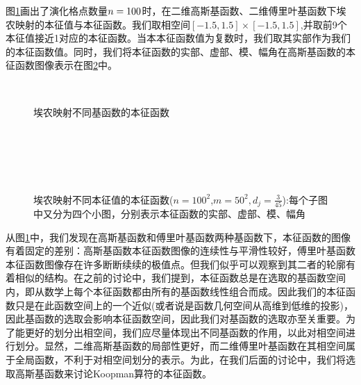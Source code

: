 图\ref{fig:henon_eig_RGFL}画出了演化格点数量$n=100\time 100$时，在二维高斯基函数、二维傅里叶基函数下埃农映射的本征值与本征函数。我们取相空间$[-1.5,1.5]\times [-1.5,1.5]$,并取前9个本征值接近1对应的本征函数。当本本征函数值为复数时，我们取其实部作为我们的本征函数值。同时，我们将本征函数的实部、虚部、模、幅角在高斯基函数的本征函数图像表示在图\ref{fig:Henon_eigen_Gauss_n100m50md45_figure8}中。
\begin{figure}
    \centering
    \\
    \caption[埃农映射不同基函数的本征函数]{埃农映射不同基函数的本征函数}\label{fig:henon_eig_RGFL}
\end{figure}
\begin{figure}
  \centering
  \\
  \\
  \\
  \\
  \caption[埃农映射不同本征值的本征函数]{埃农映射不同本征值的本征函数($n=100^2$,$m=50^2,d_j=\frac{3}{45}$):每个子图中又分为四个小图，分别表示本征函数的实部、虚部、模、幅角}\label{fig:Henon_eigen_Gauss_n100m50md45_figure8}
\end{figure}

从图\ref{fig:henon_eig_RGFL}中，我们发现在高斯基函数和傅里叶基函数两种基函数下，本征函数的图像有着固定的差别：高斯基函数本征函数图像的连续性与平滑性较好，傅里叶基函数本征函数图像存在许多断断续续的极值点。但我们似乎可以观察到其二者的轮廓有着相似的结构。在之前的讨论中，我们提到，本征函数总是在选取的基函数空间内，即从数学上每个本征函数都由所有的基函数线性组合而成。因此我们的本征函数只是在此函数空间上的一个近似(或者说是函数几何空间从高维到低维的投影)，因此基函数的选取会影响本征函数空间，因此我们对基函数的选取亦至关重要。为了能更好的划分出相空间，我们应尽量体现出不同基函数的作用，以此对相空间进行划分。显然，二维高斯基函数的局部性更好，而二维傅里叶基函数在其相空间属于全局函数，不利于对相空间划分的表示。为此，在我们后面的讨论中，我们将选取高斯基函数来讨论Koopman算符的本征函数。

